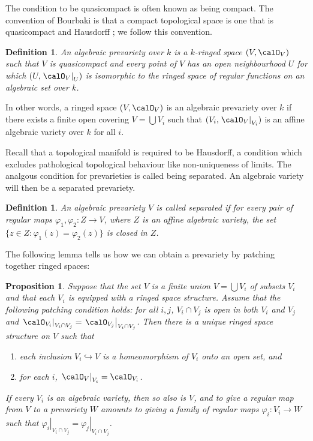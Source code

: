 \documentclass[12pt]{amsart}
\theoremstyle{plain}
\newtheorem{definition}[theorem]{Definition}
\newtheorem{proposition}[theorem]{Proposition}
\begin{document}
The condition to be quasicompact is often known as being compact.
The convention of Bourbaki is that a compact topological space is one that is quasicompact and Hausdorff \cite[\S 2 g.]{Milne13}; we follow this convention.

\begin{definition}
An algebraic prevariety over $k$ is a $k$-ringed space $(V, \calO_V)$ such that $V$ is quasicompact and every point of $V$ has an open neighbourhood $U$ for which $(U, \left. \calO_V \right|_U)$ is isomorphic to the ringed space of regular functions on an algebraic set over $k$.
\end{definition}

In other words, a ringed space $(V, \calO_V)$ is an algebraic prevariety over $k$ if there exists a finite open covering $V = \bigcup V_i$ such that $(V_i, \left. \calO_V \right|_{V_i})$ is an affine algebraic variety over $k$ for all $i$.

Recall that a topological manifold is required to be Hausdorff, a condition which excludes pathological topological behaviour like non-uniqueness of limits.
The analgous condition for prevarieties is called being separated.
An algebraic variety will then be a separated prevariety.

\begin{definition}
An algebraic prevariety $V$ is called separated if for every pair of regular maps $\varphi_1, \varphi_2 : Z \to V$, where $Z$ is an affine algebraic variety, the set $\{z \in Z : \varphi_1(z) = \varphi_2(z)\}$ is closed in $Z$.
\end{definition}

The following lemma tells us how we can obtain a prevariety by patching together ringed spaces:

\begin{proposition}
Suppose that the set $V$ is a finite union $V = \bigcup V_i$  of subsets $V_i$ and that each $V_i$ is equipped with a ringed space structure.
Assume that the following patching condition holds: for all $i,j$, $V_i \cap V_j$ is open in both $V_i$ and $V_j$ and $\left. \calO_{V_i} \right|_{V_i \cap V_j} = \left. \calO_{V_j} \right|_{V_i \cap V_j}$.
Then there is a unique ringed space structure on $V$ such that
\begin{enumerate}
\item
each inclusion $V_i \hookrightarrow V$ is a homeomorphism of $V_i$ onto an open set, and

\item
for each $i$, $\left. \calO_V \right|_{V_i} = \calO_{V_i}$.
\end{enumerate}
If every $V_i$ is an algebraic variety, then so also is $V$, and to give a regular map from $V$ to a prevariety $W$ amounts to giving a family of regular maps $\varphi_i : V_i \to W$ such that $\left. \varphi_i \right|_{V_i \cap V_j} = \left. \varphi_j \right|_{V_i \cap V_j}$.
\end{proposition}
\end{document}
